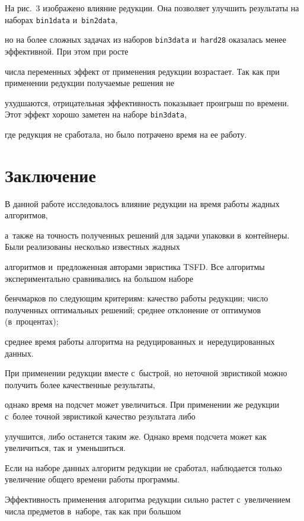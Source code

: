 На рис.~3 изображено влияние редукции. Она поз\-во\-ля\-ет улучшить результаты на наборах \texttt{bin1data} и~\texttt{bin2data}, 

но на более слож\-ных задачах из наборов \texttt{bin3data} и~\texttt{hard28} оказалась менее эффективной. При этом при рос\-те 

числа переменных эффект от применения редукции воз\-рас\-та\-ет. Так как при применении редукции по\-лу\-ча\-емые решения не 

ухуд\-ша\-ют\-ся, отрицательная эф\-фек\-тив\-ность показывает проигрыш по времени. Этот эффект хорошо заметен на наборе \texttt{bin3data}, 

где редукция не сработала, но было по\-тра\-че\-но время на ее ра\-боту.



\section{Заключение}



В данной работе исследовалось влияние редукции на время работы жад\-ных алгоритмов, 

а~так\-же на точ\-ность полученных решений для задачи упа\-ков\-ки в~контейнеры. Были реализованы несколько известных жад\-ных 

алгоритмов и~пред\-ло\-жен\-ная авторами эвристика TSFD. Все алгоритмы экспериментально сравнивались на большом наборе 

бенч\-мар\-ков по сле\-ду\-ющим критериям: качество работы редукции; чис\-ло полученных оптимальных решений; сред\-нее отклонение от оптимумов (в~процентах); 

сред\-нее время работы алгоритма на редуцированных и~нередуцированных данных.



При применении редукции вместе с~быст\-рой, но не\-точ\-ной эвристикой мож\-но получить более качественные результаты, 

однако время на под\-счет может увеличиться. При применении же редукции с~более точ\-ной эвристикой качество результата либо

 улучшится, либо останется таким же. Однако время под\-сче\-та может как увеличиться, так и~уменьшиться. 

 Если на наборе данных алгоритм редукции не сработал, наблюдается только увеличение общего времени работы программы. 

 Эф\-фек\-тив\-ность применения алгоритма редукции силь\-но рас\-тет с~увеличением чис\-ла предметов в~наборе, так как при большом 

